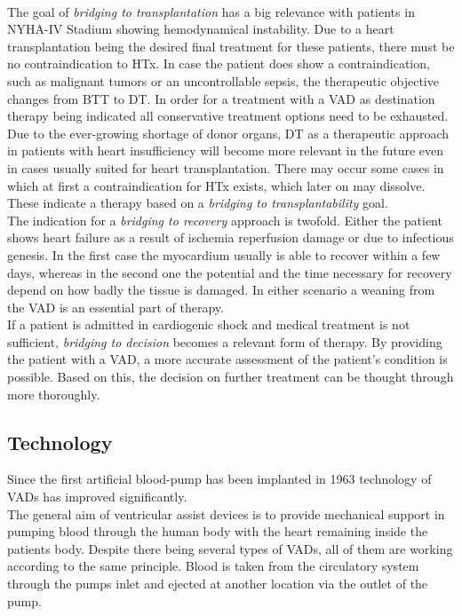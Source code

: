 \\The goal of \textit{bridging to transplantation} has a big relevance with patients in NYHA-IV Stadium showing hemodynamical instability. Due to a heart transplantation being the desired final treatment for these patients, there must be no contraindication to HTx. In case the patient does show a contraindication, such as malignant tumors or an uncontrollable sepsis, the therapeutic objective changes from BTT to DT. In order for a treatment with a VAD as destination therapy being indicated all conservative treatment options need to be exhausted. Due to the ever-growing shortage of donor organs, DT as a therapeutic approach in patients with heart insufficiency will become more relevant in the future even in cases usually suited for heart transplantation. \cite{VAD7} There may occur some cases in which at first a contraindication for HTx exists, which later on may dissolve. These indicate a therapy based on a \textit{bridging to transplantability} goal. \cite{VAD6}
\\The indication for a \textit{bridging to recovery} approach is twofold. Either the patient shows heart failure as a result of ischemia reperfusion damage or due to infectious genesis. In the first case the myocardium usually is able to recover within a few days, whereas in the second one the potential and the time necessary for recovery depend on how badly the tissue is damaged. In either scenario a weaning from the VAD is an essential part of therapy. \cite{VAD7}
\\If a patient is admitted in cardiogenic shock and medical treatment is not sufficient, \textit{bridging to decision} becomes a relevant form of therapy. By providing the patient with a VAD, a more accurate assessment of the patient's condition is possible.
Based on this, the decision on further treatment can be thought through more thoroughly. \cite{VAD6}

\subsection{Technology}
Since the first artificial blood-pump has been implanted in 1963 \cite{VAD9} technology of VADs has improved significantly.
\\The general aim of ventricular assist devices is to provide mechanical support in pumping blood through the human body with the heart remaining inside the patients body. Despite there being several types of VADs, all of them are working according to the same principle. Blood is taken from the circulatory system through the pumps inlet and ejected at another location via the outlet of the pump. \cite{VAD1}


